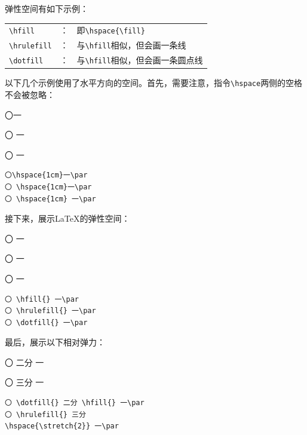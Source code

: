 弹性空间有如下示例：

  \begin{tabular}{lcl}%
    \verb|\hfill| & ：& 即\verb+\hspace{\fill}+\\
    \verb|\hrulefill| & ：& 与\verb+\hfill+相似，但会画一条线\\
    \verb|\dotfill| & ：& 与\verb+\hfill+相似，但会画一条圆点线\\
  \end{tabular}

以下几个示例使用了水平方向的空间。首先，需要注意，指令\verb|\hspace|两侧的空格不会被忽略：

\begin{codelist}[4.4]{
〇\hspace{1cm}一\par
〇 \hspace{1cm}一\par
〇 \hspace{1cm} 一\par
}\begin{verbatim}
〇\hspace{1cm}一\par
〇 \hspace{1cm}一\par
〇 \hspace{1cm} 一\par
\end{verbatim}
\end{codelist}

接下来，展示\LaTeX 的弹性空间：

\begin{codelist}[4.5]{
〇 \hfill{} 一\par
〇 \hrulefill{} 一\par
〇 \dotfill{} 一\par
}\begin{verbatim}
〇 \hfill{} 一\par
〇 \hrulefill{} 一\par
〇 \dotfill{} 一\par
\end{verbatim}
\end{codelist}

最后，展示以下相对弹力：

\begin{codelist}[4.6]{
〇 \dotfill{} 二分 \hfill{} 一\par
〇 \hrulefill{} 三分
 一\par
}\begin{verbatim}
〇 \dotfill{} 二分 \hfill{} 一\par
〇 \hrulefill{} 三分
\hspace{\stretch{2}} 一\par
\end{verbatim}
\end{codelist}

